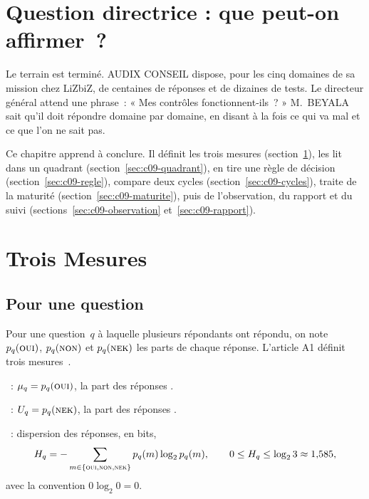 \bigskip

\section*{Question directrice : que peut-on affirmer~?}

Le terrain est terminé. AUDIX CONSEIL dispose, pour les cinq domaines de sa
mission chez LiZbiZ, de centaines de réponses et de dizaines de tests. Le
directeur général attend une phrase~: « Mes contrôles fonctionnent-ils~? »
M.~BEYALA sait qu'il doit répondre domaine par domaine, en disant à la fois
ce qui va mal et ce que l'on ne sait pas.

Ce chapitre apprend à conclure. Il définit les trois mesures
(section~\ref{sec:c09-mesures}), les lit dans un quadrant
(section~\ref{sec:c09-quadrant}), en tire une règle de décision
(section~\ref{sec:c09-regle}), compare deux cycles
(section~\ref{sec:c09-cycles}), traite de la maturité
(section~\ref{sec:c09-maturite}), puis de l'observation, du rapport et du
suivi (sections~\ref{sec:c09-observation} et~\ref{sec:c09-rapport}).

\separateur

\section{Trois Mesures}
\label{sec:c09-mesures}

\subsection{Pour une question}

Pour une question~$q$ à laquelle plusieurs répondants ont répondu, on note
$p_q(\textsc{oui})$, $p_q(\textsc{non})$ et $p_q(\textsc{nek})$ les parts de chaque réponse. L'article
A1 définit trois mesures~\cite{minka2026nek}.

\begin{boxdef}
~: $\mu_q =
p_q(\textsc{oui})$, la part des réponses \OUI{}.

\medskip
{}~: $U_q = p_q(\textsc{nek})$,
la part des réponses \NEK{}.

\medskip
{}~: dispersion des réponses, en bits,
\[
    H_q = -\sum_{m \in \{\textsc{oui}, \textsc{non}, \textsc{nek}\}} p_q(m) \log_2 p_q(m),
    \qquad 0 \leq H_q \leq \log_2 3 \approx 1{,}585,
\]
avec la convention $0 \log_2 0 = 0$.
\end{boxdef}

